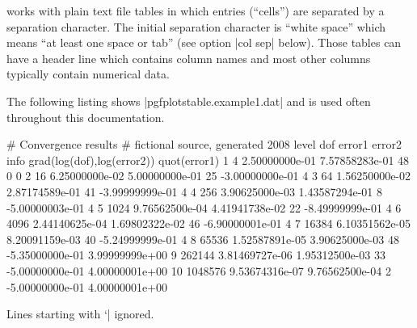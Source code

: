 \documentclass[a4paper]{ltxdoc}
\begin{document}
\PGFPlotstable{} works with plain text file tables in which entries (``cells'')
are separated by a separation character. The initial separation character is
``white space'' which means ``at least one space or tab'' (see option |col sep|
below). Those tables can have a header line which contains column names and
most other columns typically contain numerical data.

\noindent The following listing shows |pgfplotstable.example1.dat| and is used
often throughout this documentation.
%
\begin{codeexample}
# Convergence results
# fictional source, generated 2008
level    dof      error1            error2   info     grad(log(dof),log(error2)) quot(error1)
1        4        2.50000000e-01    7.57858283e-01    48       0                 0
2        16       6.25000000e-02    5.00000000e-01    25       -3.00000000e-01   4
3        64       1.56250000e-02    2.87174589e-01    41       -3.99999999e-01   4
4        256      3.90625000e-03    1.43587294e-01    8        -5.00000003e-01   4
5        1024     9.76562500e-04    4.41941738e-02    22       -8.49999999e-01   4
6        4096     2.44140625e-04    1.69802322e-02    46       -6.90000001e-01   4
7        16384    6.10351562e-05    8.20091159e-03    40       -5.24999999e-01   4
8        65536    1.52587891e-05    3.90625000e-03    48       -5.35000000e-01   3.99999999e+00
9        262144   3.81469727e-06    1.95312500e-03    33       -5.00000000e-01   4.00000001e+00
10       1048576  9.53674316e-07    9.76562500e-04    2        -5.00000000e-01   4.00000001e+00
\end{codeexample}
%
Lines starting with `|%
ignored.
\end{document}
